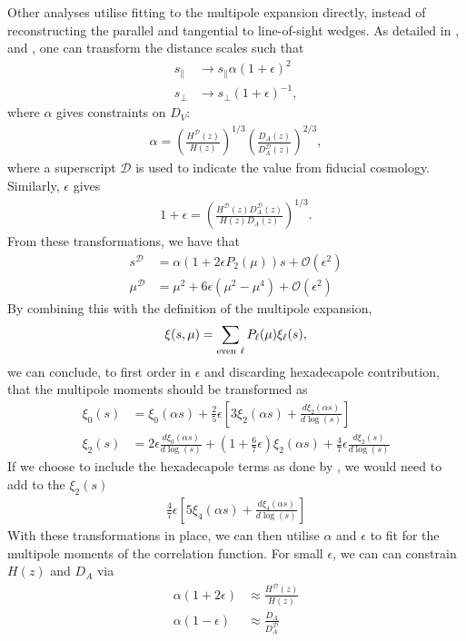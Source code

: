 \documentclass[titlesmallcaps, examinerscopy, copyrightpage]{uqthesis}
\begin{document}
Other analyses utilise fitting to the multipole expansion directly, instead of reconstructing the parallel and tangential to line-of-sight wedges. As detailed in \citet{PadmanabhanWhite2008}, \citet{KazinSanchezBlanton2012} and \citet{XuCuesta2013}, one can transform the distance scales such that
\begin{align}
s_\parallel &\rightarrow s_\parallel \alpha (1 + \epsilon)^2 \\
s_\perp &\rightarrow s_\perp (1 + \epsilon)^{-1},
\end{align}
where $\alpha$ gives constraints on $D_V$:
\begin{align}
\alpha = \left( \frac{H^{\mathcal{D}}(z)}{H(z)}\right) ^{1/3} \left( \frac{D_A(z)}{D_A^{\mathcal{D}}(z)} \right)^{2/3},
\end{align}
where a superscript $\mathcal{D}$ is used to indicate the value from fiducial cosmology. Similarly, $\epsilon$ gives
\begin{align}
1 + \epsilon = \left( \frac{H^{\mathcal{D}}(z) D_A^{\mathcal{D}}(z)}{H(z) D_A(z)} \right) ^{1/3}.
\end{align}
From these transformations, we have that
\begin{align}
s^\mathcal{D} &= \alpha (1 + 2\epsilon P_2(\mu)) s + \mathcal{O}(\epsilon^2) \\
\mu^\mathcal{D} &= \mu^2 + 6 \epsilon (\mu^2 - \mu^4) + \mathcal{O}(\epsilon^2)
\end{align}
By combining this with the definition of the multipole expansion,
\begin{align}
\xi(s, \mu) = \sum\limits_{\rm{even }\ \ell} P_\ell(\mu) \xi_\ell(s),
\end{align}
we can conclude, to first order in $\epsilon$ and discarding hexadecapole contribution, that the multipole moments should be transformed as \citep{KazinSanchezBlanton2012}
\begin{align}
\xi_0(s) &= \xi_0(\alpha s) + \frac{2}{5}\epsilon \left[ 3 \xi_2(\alpha s) + \frac{d \xi_2(\alpha s)}{d \log(s)}\right] \\
\xi_2(s) &= 2\epsilon \frac{d \xi_0(\alpha s)}{d\log(s)} + \left( 1 + \frac{6}{7}\epsilon\right) \xi_2(\alpha s) + \frac{4}{7} \epsilon \frac{d \xi_2(s)}{d \log(s)} 
\end{align}
If we choose to include the hexadecapole terms as done by \citet{XuCuesta2013}, we would need to add to the $\xi_2(s)$ 
\begin{align}
\frac{4}{7}\epsilon \left[ 5 \xi_4 (\alpha s) + \frac{d \xi_4(\alpha s)}{d \log(s)} \right]
\end{align}
With these transformations in place, we can then utilise $\alpha$ and $\epsilon$ to fit for the multipole moments of the correlation function. For small $\epsilon$, we can can constrain $H(z)$ and $D_A$ via
\begin{align}
\alpha(1 + 2\epsilon) &\approx \frac{H^\mathcal{D}(z)}{H(z)} \\
\alpha(1 - \epsilon) &\approx \frac{D_A}{D_A^\mathcal{D}}
\end{align}
\end{document}
